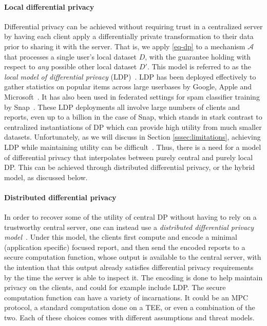 \documentclass[11pt]{article}
\begin{document}
\paragraph{Local differential privacy} Differential privacy can be achieved without requiring trust in a centralized server by having each client apply a differentially private transformation to their data prior to sharing it with the server. That is, we apply \cref{eq-dp} to a mechanism $\mathcal{A}$ that processes a single user's local dataset $D$, with the guarantee holding with respect to \emph{any} possible other local dataset $D'$.
This model is referred to as the \textit{local model of differential privacy} (LDP)~\cite{Warner65, KLNRS11}. LDP has been deployed effectively to gather statistics on popular items across large userbases by Google, Apple and Microsoft~\cite{rappor:15, applewhitepaper:17,  collecting-telemetry-data-privately}. It has also been used in federated settings for spam classifier training by Snap~\cite{snap}. These LDP deployments all involve large numbers of clients and reports, even up to a billion in the case of Snap, which stands in stark contrast to centralized instantiations of DP which can provide high utility from much smaller datasets. Unfortunately, as we will discuss in Section \ref{sssec:limitations}, achieving LDP while maintaining utility can be difficult~\cite{KLNRS11,Ullman18}. Thus, there is a need for a model of differential privacy that interpolates between purely central and purely local DP. This can be achieved through distributed differential privacy, or the hybrid model, as discussed below.

\paragraph{Distributed differential privacy} In order to recover some of the utility of central DP without having to rely on a trustworthy central server, one can instead use a \emph{distributed differential privacy model}~\cite{dwork2006our, shi2011privacy,prochlo,cheu2019distributed}. Under this model, the clients first compute and encode a minimal (application specific) focused report, and then send the encoded reports to a secure computation function, whose output is available to the central server, with the intention that this output already satisfies differential privacy requirements by the time the server is able to inspect it.  The encoding is done to help maintain privacy on the clients, and could for example include LDP. The secure computation function can have a variety of incarnations. It could be an MPC protocol, a standard computation done on a TEE, or even a combination of the two.  Each of these choices comes with different assumptions and threat models.
\end{document}
